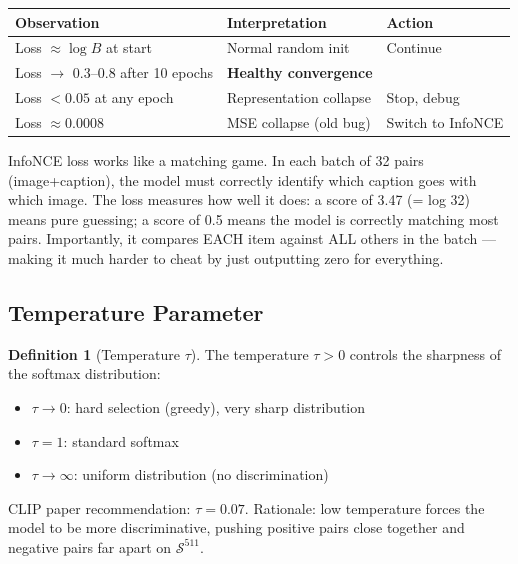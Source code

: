 \documentclass[12pt,a4paper]{article}
\theoremstyle{definition}
\newtheorem{definition}{Definition}[section]
\theoremstyle{plain}
\theoremstyle{remark}
\newcommand{\Sph}{\mathcal{S}}
\begin{document}
\begin{tcolorbox}[keybox, title=Training Convergence Diagnostic]
\begin{tabular}{lll}
\toprule
Observation & Interpretation & Action \\
\midrule
Loss $\approx \log B$ at start & Normal random init & Continue \\
Loss $\to$ 0.3--0.8 after 10 epochs & \textbf{Healthy convergence} & \\
Loss $< 0.05$ at any epoch & Representation collapse & Stop, debug \\
Loss $\approx 0.0008$ & MSE collapse (old bug) & Switch to InfoNCE \\
\bottomrule
\end{tabular}
\end{tcolorbox}

\begin{tcolorbox}[laymanbox]
InfoNCE loss works like a matching game. In each batch of 32 pairs (image+caption),
the model must correctly identify which caption goes with which image. The loss
measures how well it does: a score of 3.47 (= log 32) means pure guessing;
a score of 0.5 means the model is correctly matching most pairs.
Importantly, it compares EACH item against ALL others in the batch —
making it much harder to cheat by just outputting zero for everything.
\end{tcolorbox}

\subsection{Temperature Parameter}

\begin{definition}[Temperature $\tau$]
The temperature $\tau > 0$ controls the sharpness of the softmax distribution:
\begin{itemize}
  \item $\tau \to 0$: hard selection (greedy), very sharp distribution
  \item $\tau = 1$: standard softmax
  \item $\tau \to \infty$: uniform distribution (no discrimination)
\end{itemize}
CLIP paper recommendation: $\tau = 0.07$. Rationale: low temperature forces the
model to be more discriminative, pushing positive pairs close together and
negative pairs far apart on $\Sph^{511}$.
\end{definition}

\newpage
\end{document}
